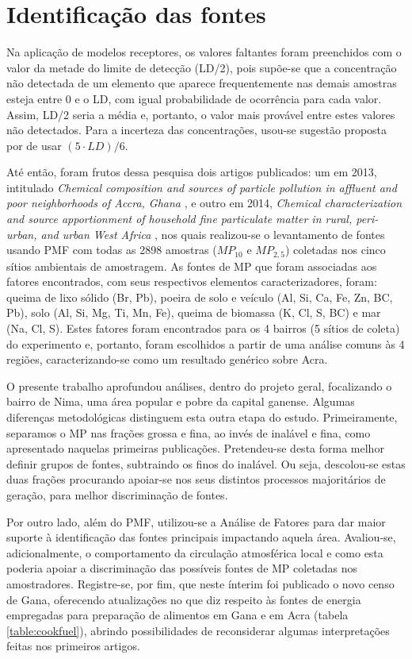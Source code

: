 \newpage
\section{Identificação das fontes}

Na aplicação de modelos receptores, os valores faltantes foram preenchidos com 
o valor da metade do limite de detecção (LD/2), pois supõe-se que a concentração
não detectada de um elemento que aparece frequentemente nas demais amostras 
esteja entre 0 e o LD, com igual probabilidade de ocorrência 
para cada valor. Assim, LD/2 seria a média e, portanto, o valor mais 
provável entre estes valores não detectados. Para a incerteza das concentrações,
usou-se sugestão proposta por \citet{polissar1998} de usar $(5 \cdot LD)/6$.

Até então, foram frutos dessa pesquisa dois artigos publicados: um em 2013, 
intitulado \textit{Chemical composition and sources of particle pollution in 
affluent and poor neighborhoods of Accra, Ghana} \citep{zhou2013}, e outro em 
2014, \textit{Chemical characterization and source apportionment of household 
fine particulate matter in rural, peri-urban, and urban West Africa} 
\citep{zhou2014}, nos quais realizou-se o levantamento de fontes usando PMF com 
todas as 2898 amostras ($MP_{10}$ e $MP_{2,5}$) coletadas nos cinco sítios 
ambientais de amostragem. As fontes de MP que foram associadas aos fatores 
encontrados, com seus respectivos elementos caracterizadores, foram: 
queima de lixo sólido (Br, Pb), poeira de solo e veículo (Al, Si, Ca, Fe, Zn, 
BC, Pb), solo (Al, Si, Mg, Ti, Mn, Fe), queima de biomassa (K, Cl, S, BC) e mar 
(Na, Cl, S). Estes fatores foram encontrados para os 4 bairros (5 sítios de 
coleta) do experimento e, portanto, foram escolhidos a partir de uma análise
comuns às 4 regiões, caracterizando-se como um resultado genérico sobre Acra.

O presente trabalho aprofundou análises, dentro do projeto geral, focalizando o 
bairro de Nima, uma área popular e pobre da capital ganense. Algumas diferenças 
metodológicas distinguem esta outra etapa do estudo. Primeiramente, separamos o 
MP nas frações grossa e fina, ao invés de inalável e fina, como apresentado 
naquelas primeiras publicações. Pretendeu-se desta forma melhor definir grupos 
de fontes, subtraindo os finos do inalável. Ou seja, descolou-se estas duas 
frações procurando apoiar-se nos seus distintos processos majoritários de 
geração, para melhor discriminação de fontes.

Por outro lado, além do PMF, utilizou-se a Análise de Fatores para dar maior 
suporte à identificação das fontes principais impactando aquela área. 
Avaliou-se, adicionalmente, o comportamento da circulação atmosférica local e 
como esta poderia apoiar a discriminação das possíveis fontes de MP coletadas 
nos amostradores. Registre-se, por fim, que neste ínterim foi publicado o novo 
censo de Gana, oferecendo atualizações no que diz respeito às fontes de energia
empregadas para preparação de alimentos em Gana e em Acra (tabela 
\ref{table:cookfuel}), abrindo possibilidades de reconsiderar algumas 
interpretações feitas nos primeiros artigos.

